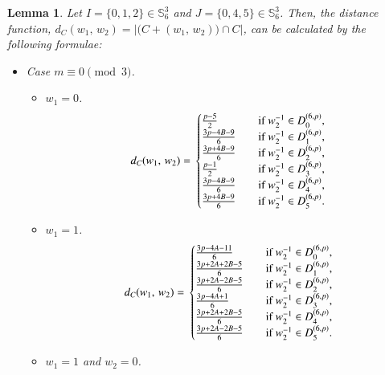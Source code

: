 \documentclass[letter]{ieice}
\newtheorem{sec3_lemma7}[sec3_lemma1]{Lemma}
\begin{document}
\begin{sec3_lemma7}\label{sec3-lemma7}
Let $ I=\lbrace0,1,2\rbrace \in  \mathbb{S}_{6}^{3}$ and $ J=\lbrace0,4,5\rbrace \in  \mathbb{S}_{6}^{3}$. Then, the distance function, $ d_{\mathit{C}}(w_{1},\,w_{2})=|\bigl(\mathit{C}+(w_{1},\,w_{2}) \bigr)\cap \mathit{C}| $, can be calculated by the following formulae:
\begin{itemize}
\item Case $ m\equiv 0 \pmod 3 $.
\begin{itemize}
\item $ w_{1}=0 $.
\begin{equation*}
d_{\mathit{C}}(w_{1},\,w_{2})=\\
\begin{cases}
\frac{p-5}{2}&\quad \mbox{if}\  w^{-1}_{2} \in  D_{0}^{(6,p)},\\
\frac{3p-4B-9}{6}&\quad \mbox{if}\  w^{-1}_{2} \in  D_{1}^{(6,p)},\\
\frac{3p+4B-9}{6}&\quad \mbox{if}\  w^{-1}_{2} \in  D_{2}^{(6,p)},\\
\frac{p-1}{2}&\quad \mbox{if}\  w^{-1}_{2} \in  D_{3}^{(6,p)},\\
\frac{3p-4B-9}{6}&\quad \mbox{if}\  w^{-1}_{2} \in  D_{4}^{(6,p)},\\
\frac{3p+4B-9}{6}&\quad \mbox{if}\  w^{-1}_{2} \in  D_{5}^{(6,p)}.
\end{cases}
\end{equation*}
\item $ w_{1}=1 $.
\begin{equation*}
d_{\mathit{C}}(w_{1},\,w_{2})=\\
\begin{cases}
\frac{3p-4A-11}{6}&\quad \mbox{if}\  w^{-1}_{2} \in  D_{0}^{(6,p)},\\
\frac{3p+2A+2B-5}{6}&\quad \mbox{if}\  w^{-1}_{2} \in  D_{1}^{(6,p)},\\
\frac{3p+2A-2B-5}{6}&\quad \mbox{if}\  w^{-1}_{2} \in  D_{2}^{(6,p)},\\
\frac{3p-4A+1}{6}&\quad \mbox{if}\  w^{-1}_{2} \in  D_{3}^{(6,p)},\\
\frac{3p+2A+2B-5}{6}&\quad \mbox{if}\  w^{-1}_{2} \in  D_{4}^{(6,p)},\\
\frac{3p+2A-2B-5}{6}&\quad \mbox{if}\  w^{-1}_{2} \in  D_{5}^{(6,p)}.
\end{cases}
\end{equation*}
\item $ w_{1}=1 $ and $ w_{2}=0 $.
\begin{equation*}

\end{equation*}
\end{itemize}
\end{itemize}
\end{sec3_lemma7}
\end{document}
